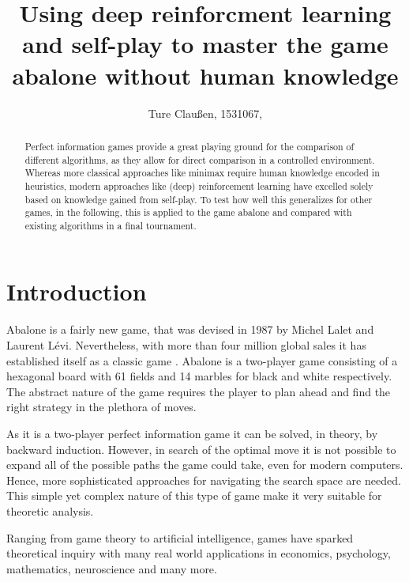 \documentclass{../lib/llncs}
\begin{document}
\title{Using deep reinforcment learning and self-play to master the game abalone without human knowledge}
\author{Ture Claußen, 1531067, }

{\def\addcontentsline#1#2#3{}\maketitle} %

\begin{abstract}
  Perfect information games provide a great playing ground for the comparison of different algorithms, as they allow for direct comparison in a controlled environment. Whereas more classical approaches like minimax require human knowledge encoded in heuristics, modern approaches like (deep) reinforcement learning have excelled solely based on knowledge gained from self-play. To test how well this generalizes for other games, in the following, this is applied to the game abalone and compared with existing algorithms in a final tournament.
\end{abstract}


\section{Introduction}
Abalone is a fairly new game, that was devised in 1987 by Michel Lalet and Laurent Lévi. Nevertheless, with more than four million global sales it has established itself as a classic game \cite{noauthor_abalone_2020}. Abalone is a two-player game consisting of a hexagonal board with 61 fields and 14 marbles for black and white respectively. The abstract nature of the game requires the player to plan ahead and find the right strategy in the plethora of moves.

As it is a two-player perfect information game it can be solved, in theory, by backward induction. However, in search of the optimal move it is not possible to expand all of the possible paths the game could take, even for modern computers. Hence, more sophisticated approaches for navigating the search space are needed. This simple yet complex nature of this type of game make it very suitable for theoretic analysis. \cite[p. 1]{demichelis_simple_2004}

Ranging from game theory to artificial intelligence, games have sparked theoretical inquiry with many real world applications in economics, psychology, mathematics, neuroscience and many more. \cite[pp. 46]{russell_artificial_2021}
\end{document}
